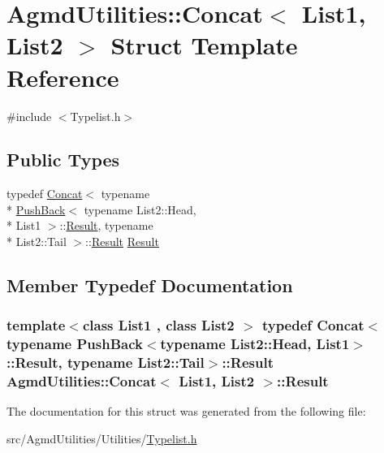 \hypertarget{struct_agmd_utilities_1_1_concat}{\section{Agmd\+Utilities\+:\+:Concat$<$ List1, List2 $>$ Struct Template Reference}
\label{struct_agmd_utilities_1_1_concat}
}


{\ttfamily \#include $<$Typelist.\+h$>$}

\subsection*{Public Types}
\begin{DoxyCompactItemize}
\item 
typedef \hyperlink{struct_agmd_utilities_1_1_concat}{Concat}$<$ typename \\*
\hyperlink{struct_agmd_utilities_1_1_push_back}{Push\+Back}$<$ typename List2\+::\+Head, \\*
List1 $>$\+::\hyperlink{struct_agmd_utilities_1_1_concat_a46a4f7e0e1ecbb51ea8acb96d83e26ea}{Result}, typename \\*
List2\+::\+Tail $>$\+::\hyperlink{struct_agmd_utilities_1_1_concat_a46a4f7e0e1ecbb51ea8acb96d83e26ea}{Result} \hyperlink{struct_agmd_utilities_1_1_concat_a46a4f7e0e1ecbb51ea8acb96d83e26ea}{Result}
\end{DoxyCompactItemize}


\subsection{Member Typedef Documentation}
\hypertarget{struct_agmd_utilities_1_1_concat_a46a4f7e0e1ecbb51ea8acb96d83e26ea}{
\subsubsection[{Result}]{\setlength{\rightskip}{0pt plus 5cm}template$<$class List1 , class List2 $>$ typedef {\bf Concat}$<$typename {\bf Push\+Back}$<$typename List2\+::\+Head, List1$>$\+::{\bf Result}, typename List2\+::\+Tail$>$\+::{\bf Result} {\bf Agmd\+Utilities\+::\+Concat}$<$ List1, List2 $>$\+::{\bf Result}}}\label{struct_agmd_utilities_1_1_concat_a46a4f7e0e1ecbb51ea8acb96d83e26ea}


The documentation for this struct was generated from the following file\+:\begin{DoxyCompactItemize}
\item 
src/\+Agmd\+Utilities/\+Utilities/\hyperlink{_typelist_8h}{Typelist.\+h}\end{DoxyCompactItemize}
